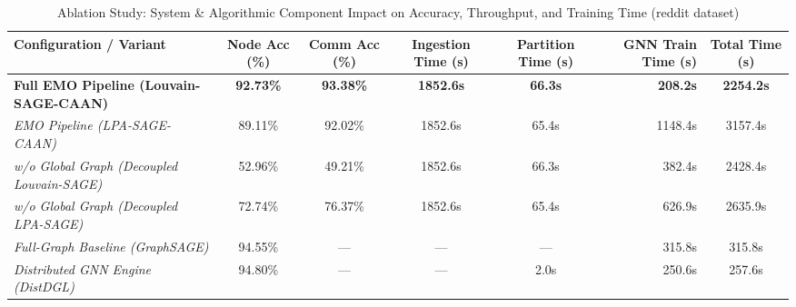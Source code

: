 \begin{table}[!t]
\renewcommand{\arraystretch}{1.2}
\caption{Ablation Study: System & Algorithmic Component Impact on Accuracy, Throughput, and Training Time (reddit dataset)}
\label{table_ablation_main}
\centering
\begin{tabular}{lccccrc}
\toprule
\textbf{Configuration / Variant} & \textbf{Node Acc (\%)} & \textbf{Comm Acc (\%)} & \textbf{Ingestion Time (s)} & \textbf{Partition Time (s)} & \textbf{GNN Train Time (s)} & \textbf{Total Time (s)} \\
\midrule
\textbf{Full EMO Pipeline (Louvain-SAGE-CAAN)} & \textbf{92.73\%} & \textbf{93.38\%} & \textbf{1852.6s} & \textbf{66.3s} & \textbf{208.2s} & \textbf{2254.2s} \\
\emph{EMO Pipeline (LPA-SAGE-CAAN)} & 89.11\% & 92.02\% & 1852.6s & 65.4s & 1148.4s & 3157.4s \\
\midrule
\emph{w/o Global Graph (Decoupled Louvain-SAGE)} & 52.96\% & 49.21\% & 1852.6s & 66.3s & 382.4s & 2428.4s \\
\emph{w/o Global Graph (Decoupled LPA-SAGE)} & 72.74\% & 76.37\% & 1852.6s & 65.4s & 626.9s & 2635.9s \\
\midrule
\emph{Full-Graph Baseline (GraphSAGE)} & 94.55\% & — & — & — & 315.8s & 315.8s \\
\emph{Distributed GNN Engine (DistDGL)} & 94.80\% & — & — & 2.0s & 250.6s & 257.6s \\
\bottomrule
\end{tabular}
\end{table}
